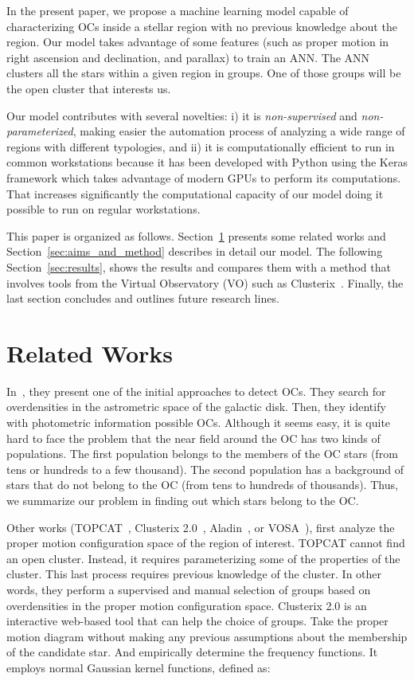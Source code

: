\documentclass[11pt,a4paper,english,twocolumn]{article}
\begin{document}
In the present paper, we propose a machine learning model capable of characterizing OCs inside a stellar region with no previous knowledge about the region. Our model takes advantage of some features (such as proper motion in right ascension and declination, and parallax) to train an ANN. The ANN clusters all the stars within a given region in groups. One of those groups will be the open cluster that interests us.

Our model contributes with several novelties: i) it is \emph{non-supervised} and \emph{non-parameterized}, making easier the automation process of analyzing a wide range of regions with different typologies, and ii) it is computationally efficient to run in common workstations because it has been developed with Python using the Keras framework which takes advantage of modern GPUs to perform its computations. That increases significantly the computational capacity of our model doing it possible to run on regular workstations.

This paper is organized as follows. Section~\ref{sec:related_works} presents some related works and Section~\ref{sec:aims_and_method} describes in detail our model. The following Section~\ref{sec:results}, shows the results and compares them with a method that involves tools from the Virtual Observatory (VO) such as Clusterix~\cite{balaguer2020clusterix}. Finally, the last section concludes and outlines future research lines.

\section{Related Works}
\label{sec:related_works}

In~\cite{castro2020hunting}, they present one of the initial approaches to detect OCs. They search for overdensities in the astrometric space of the galactic disk. Then, they identify with photometric information possible OCs. Although it seems easy, it is quite hard to face the problem that the near field around the OC has two kinds of populations. The first population belongs to the members of the OC stars (from tens or hundreds to a few thousand). The second population has a background of stars that do not belong to the OC (from tens to hundreds of thousands). Thus, we summarize our problem in finding out which stars belong to the OC.

Other works (TOPCAT~\cite{taylor2005topcat}, Clusterix 2.0~\cite{balaguer2020clusterix}, Aladin~\cite{bonnarel2000aladin}, or VOSA~\cite{bayo2008vosa}), first analyze the proper motion configuration space of the region of interest. TOPCAT cannot find an open cluster. Instead, it requires parameterizing some of the properties of the cluster. This last process requires previous knowledge of the cluster. In other words, they perform a supervised and manual selection of groups based on overdensities in the proper motion configuration space. Clusterix 2.0 is an interactive web-based tool that can help the choice of groups. Take the proper motion diagram without making any previous assumptions about the membership of the candidate star. And empirically determine the frequency functions. It employs normal Gaussian kernel functions, defined as:
\end{document}
